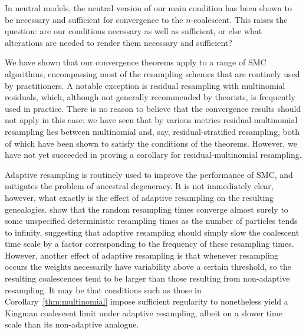 In neutral models, the neutral version of our main condition has been shown to be necessary and sufficient for convergence to the $n$-coalescent. This raises the question: are our conditions necessary as well as sufficient, or else what alterations are needed to render them necessary and sufficient?

We have shown that our convergence theorems apply to a range of SMC algorithms, encompassing most of the resampling schemes that are routinely used by practitioners. A notable exception is residual resampling with multinomial residuals, which, although not generally recommended by theorists, is frequently used in practice.
There is no reason to believe that the convergence results should not apply in this case: we have seen that by various metrics residual-multinomial resampling lies between multinomial and, say, residual-stratified resampling, both of which have been shown to satisfy the conditions of the theorems.
However, we have not yet succeeded in proving a corollary for residual-multinomial resampling.

Adaptive resampling is routinely used to improve the performance of SMC, and  mitigates the problem of ancestral degeneracy. It is not immediately clear, however, what exactly is the effect of adaptive resampling on the resulting genealogies. 
\textcite{delmoral2012} show that the random resampling times converge almost surely to some unspecified deterministic resampling times as the number of particles tends to infinity, suggesting that adaptive resampling should simply slow the coalescent time scale by a factor corresponding to the frequency of these resampling times.
However, another effect of adaptive resampling is that whenever resampling occurs the weights necessarily have variability above a certain threshold, so the resulting coalescences tend to be larger than those resulting from non-adaptive resampling.
It may be that conditions such as those in Corollary~\ref{thm:multinomial} impose sufficient regularity to nonetheless yield a Kingman coalescent limit under adaptive resampling, albeit on a slower time scale than its non-adaptive analogue.

